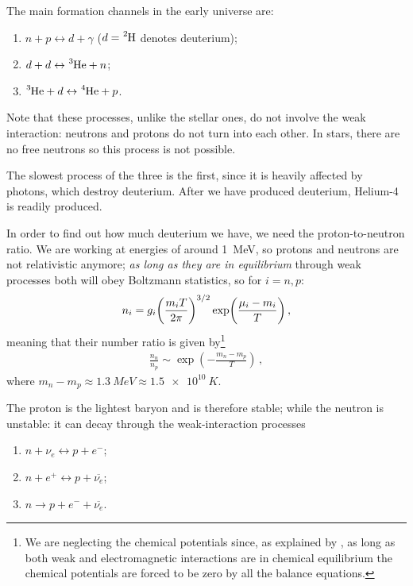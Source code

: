 \documentclass[main.tex]{subfiles}
\begin{document}

The main formation channels in the early universe are: 
%
\begin{enumerate}
    \item \(n+p \leftrightarrow d + \gamma \) (\(d= \ce{^{2}H}\) denotes deuterium);
    \item \(d + d \leftrightarrow \ce{^{3}He} + n\);
    \item \(\ce{^{3}He} + d \leftrightarrow \ce{^{4}He} + p\).
\end{enumerate}

Note that these processes, unlike the stellar ones, do not involve the weak interaction: neutrons and protons do not turn into each other.
In stars, there are no free neutrons so this process is not possible.

The slowest process of the three is the first, since it is heavily affected by photons, which destroy deuterium.
After we have produced deuterium, Helium-4 is readily produced.


In order to find out how much deuterium we have, we need the proton-to-neutron ratio. 
We are working at energies of around \SI{1}{MeV}, so protons and neutrons are not relativistic anymore; \emph{as long as they are in equilibrium} through weak processes both will obey Boltzmann statistics, so for \(i = n, p\): 
%
\begin{align}
  n_i = g_{i} \qty(\frac{m_i T}{2 \pi })^{3/2} \exp(\frac{\mu_i - m_i}{T})
\,,
\end{align}
%
meaning that their number ratio is given by\footnote{We are neglecting the chemical potentials since, as explained by \textcite[sec.\ 8.6.2]{colespCosmology2002}, as long as both weak and electromagnetic interactions are in chemical equilibrium the chemical potentials are forced to be zero by all the balance equations.}
%
\begin{align}
  \frac{n_n}{n_p} \sim \exp(-\frac{m_n - m_p}{T})
\,,
\end{align}
%
where \(m_n - m_p \approx \SI{1.3}{MeV} \approx \SI{1.5e10}{K}\).

The proton is the lightest baryon and is therefore stable; while the neutron is unstable: it can decay through the weak-interaction processes 
\begin{enumerate}
    \item \(n + \nu _e \leftrightarrow p + e^{-}\);
    \item \(n + e^{+} \leftrightarrow p + \overline{\nu _e} \);
    \item \(n \rightarrow p + e^{-} + \overline{\nu _e} \).
\end{enumerate}
\end{document}
